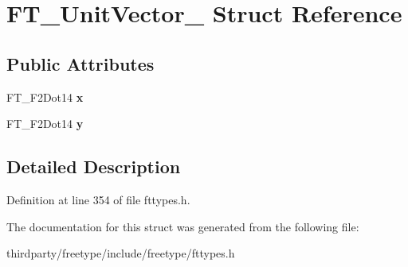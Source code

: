 \hypertarget{struct_f_t___unit_vector__}{}\section{F\+T\+\_\+\+Unit\+Vector\+\_\+ Struct Reference}
\label{struct_f_t___unit_vector__}
\subsection*{Public Attributes}
\begin{DoxyCompactItemize}
\item 
\mbox{\label{struct_f_t___unit_vector___a03c9f8ae35a5ad1bcac49995a9dac714}} 
F\+T\+\_\+\+F2\+Dot14 {\bfseries x}
\item 
\mbox{\label{struct_f_t___unit_vector___a12eb9ad5c47614f5f2d3f9e401933d0e}} 
F\+T\+\_\+\+F2\+Dot14 {\bfseries y}
\end{DoxyCompactItemize}


\subsection{Detailed Description}


Definition at line 354 of file fttypes.\+h.



The documentation for this struct was generated from the following file\+:\begin{DoxyCompactItemize}
\item 
thirdparty/freetype/include/freetype/fttypes.\+h\end{DoxyCompactItemize}
